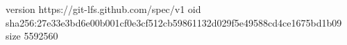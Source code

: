 version https://git-lfs.github.com/spec/v1
oid sha256:27e33e3bd6e00b001cf0e3cf512cb59861132d029f5e49588cd4ce1675bd1b09
size 5592560
